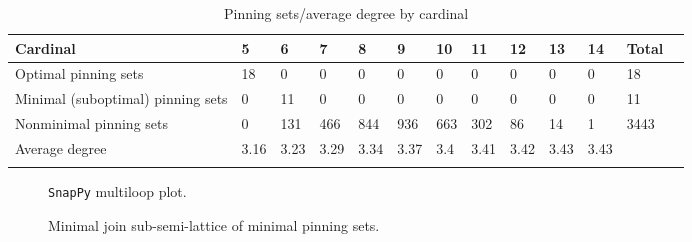 \documentclass{article}%
\begin{document}
\begin{table}[ht]
	\caption{Pinning sets/average degree by cardinal}
	\centering
	\renewcommand{\arraystretch}{1.5}
	\begin{tabularx}{\textwidth}{lXXXXXXXXXXXX}
		\toprule
			Cardinal & 5 & 6 & 7 & 8 & 9 & 10 & 11 & 12 & 13 & 14 & Total\\
			\hline
			Optimal pinning sets & 18 & 0 & 0 & 0 & 0 & 0 & 0 & 0 & 0 & 0 & 18 \\
			Minimal (suboptimal) pinning sets & 0 & 11 & 0 & 0 & 0 & 0 & 0 & 0 & 0 & 0 & 11 \\
			Nonminimal pinning sets & 0 & 131 & 466 & 844 & 936 & 663 & 302 & 86 & 14 & 1 & 3443 \\
			Average degree & 3.16 & 3.23 & 3.29 & 3.34 & 3.37 & 3.4 & 3.41 & 3.42 & 3.43 & 3.43 &  \\
		\bottomrule \\ 
	\end{tabularx}
\end{table}

\begin{multicols}{2}
\begin{figure}[H]
\centering

\caption{\texttt{SnapPy} multiloop plot.}
\label{fig:tex/img/[[18, 24, 1, 19], [19, 8, 20, 7], [17, 6, 18, 7], [13, 23, 14, 24], [1, 9, 2, 8], [20, 16, 21, 17], [12, 5, 13, 6], [22, 4, 23, 5], [14, 10, 15, 9], [2, 15, 3, 16], [21, 11, 22, 12], [3, 10, 4, 11]].svg}
\end{figure}
\columnbreak

\begin{figure}[H]
\centering
\scalebox{0.8}{}
\caption{Minimal join sub-semi-lattice of minimal pinning sets.}
\label{fig:tex/img/[[18, 24, 1, 19], [19, 8, 20, 7], [17, 6, 18, 7], [13, 23, 14, 24], [1, 9, 2, 8], [20, 16, 21, 17], [12, 5, 13, 6], [22, 4, 23, 5], [14, 10, 15, 9], [2, 15, 3, 16], [21, 11, 22, 12], [3, 10, 4, 11]].pgf}
\end{figure}
\end{multicols}

\newpage
\end{document}
